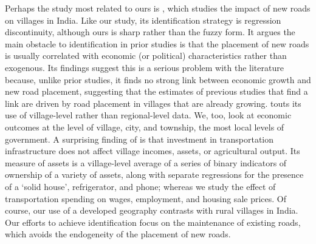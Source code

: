 Perhaps the study most related to ours is \cite{asher2020}, which studies the impact of new roads on villages in India. Like our study, its identification strategy is regression discontinuity, although ours is sharp rather than the fuzzy form.  It argues the main obstacle to identification in prior studies is that the placement of new roads is usually correlated with economic (or political) characteristics rather than exogenous.  Its findings suggest this is a serious problem with the literature because, unlike prior studies, it finds no strong link between economic growth and new road placement, suggesting that the estimates of previous studies that find a link are driven by road placement in villages that are already growing. \cite{asher2020} touts its use of village-level rather than regional-level data.  We, too, look at economic outcomes at the level of village, city, and township, the most local levels of government.  A surprising finding of \cite{asher2020} is that investment in transportation infrastructure does not affect village incomes, assets, or agricultural output.  Its measure of assets is a village-level average of a series of binary indicators of ownership of a variety of assets, along with separate regressions for the presence of a ‘solid house’, refrigerator, and phone; whereas we study the effect of transportation spending on wages, employment, and housing sale prices.  Of course, our use of a developed geography contrasts with rural villages in India.  Our efforts to achieve identification focus on the maintenance of existing roads, which avoids the endogeneity of the placement of new roads.

